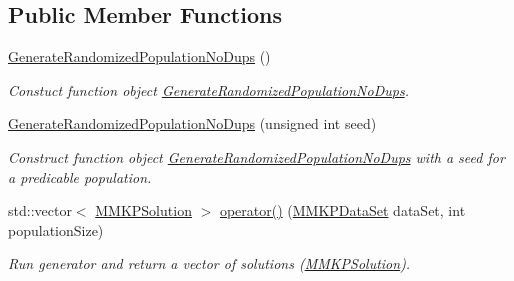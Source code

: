 \subsection*{Public Member Functions}
\begin{DoxyCompactItemize}
\item 
\hypertarget{class_generate_randomized_population_no_dups_a2daaef37cfadbf99d106720d9516d882}{\hyperlink{class_generate_randomized_population_no_dups_a2daaef37cfadbf99d106720d9516d882}{Generate\+Randomized\+Population\+No\+Dups} ()}\label{class_generate_randomized_population_no_dups_a2daaef37cfadbf99d106720d9516d882}

\begin{DoxyCompactList}\small\item\em Constuct function object \hyperlink{class_generate_randomized_population_no_dups}{Generate\+Randomized\+Population\+No\+Dups}. \end{DoxyCompactList}\item 
\hypertarget{class_generate_randomized_population_no_dups_a3d144613c04fb863924a5311461a985d}{\hyperlink{class_generate_randomized_population_no_dups_a3d144613c04fb863924a5311461a985d}{Generate\+Randomized\+Population\+No\+Dups} (unsigned int seed)}\label{class_generate_randomized_population_no_dups_a3d144613c04fb863924a5311461a985d}

\begin{DoxyCompactList}\small\item\em Construct function object \hyperlink{class_generate_randomized_population_no_dups}{Generate\+Randomized\+Population\+No\+Dups} with a seed for a predicable population. \end{DoxyCompactList}\item 
\hypertarget{class_generate_randomized_population_no_dups_a9fa6bb86573aad1a924cea7908c6c5b6}{std\+::vector$<$ \hyperlink{class_m_m_k_p_solution}{M\+M\+K\+P\+Solution} $>$ \hyperlink{class_generate_randomized_population_no_dups_a9fa6bb86573aad1a924cea7908c6c5b6}{operator()} (\hyperlink{class_m_m_k_p_data_set}{M\+M\+K\+P\+Data\+Set} data\+Set, int population\+Size)}\label{class_generate_randomized_population_no_dups_a9fa6bb86573aad1a924cea7908c6c5b6}

\begin{DoxyCompactList}\small\item\em Run generator and return a vector of solutions (\hyperlink{class_m_m_k_p_solution}{M\+M\+K\+P\+Solution}). \end{DoxyCompactList}\end{DoxyCompactItemize}


